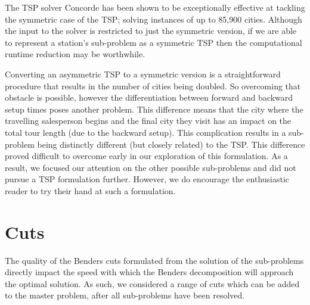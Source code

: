 The TSP solver Concorde has been shown to be exceptionally
effective at tackling the symmetric case of the TSP;
solving instances of up to 85,900 cities.
Although the input to the solver is restricted to just 
the symmetric version, if we are able to represent a
station's sub-problem as a symmetric TSP then the computational
runtime reduction may be worthwhile.

Converting an asymmetric TSP to a symmetric version is a straightforward
procedure that results in the number of cities being doubled.
So overcoming that obstacle is possible, however the differentiation
between forward and backward setup times poses another
problem.
This difference means that the city where the travelling salesperson
begins and the final city they visit has an impact on the total tour
length (due to the backward setup).
This complication results in a sub-problem
being distinctly different (but closely related) 
to the TSP.
This difference proved difficult to overcome early in our
exploration of this formulation.
As a result, we focused our attention on the other
possible sub-problems and did not pursue
a TSP formulation further.
However, we do encourage the enthusiastic reader to try their hand 
at such a formulation.

\section{Cuts}
\label{sec:bend:cuts}
The quality of the Benders cuts formulated from the solution
of the sub-problems directly impact the
speed with which the Benders decomposition will
approach the optimal solution.
As such, we considered a range of cuts which
can be added to the master problem, after
all sub-problems have been resolved.

